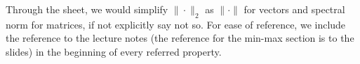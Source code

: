 \documentclass[11pt,landscape,a4paper]{article}
\newcommand{\HEADER}[1]{\begin{tcolorbox}
    \centering
    #1
\end{tcolorbox}}
\begin{document}
\small
\begin{multicols*}{4}

\HEADER{Through the sheet, we would simplify $\|\cdot\|_2$ as $\|\cdot\|$ for vectors and spectral norm for matrices, if not explicitly say not so. For ease of reference, we include the reference to the lecture notes (the reference for the min-max section is to the slides) in the beginning of every referred property.}





























\end{multicols*}
\end{document}
